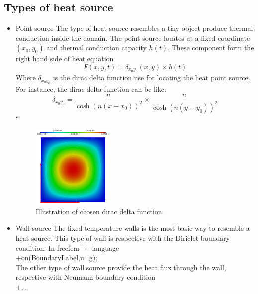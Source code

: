 \subsection{Types of heat source}
\begin{itemize}
	\item Point source
	The type of heat source resembles a tiny object produce thermal conduction inside the domain. The point source locates at a fixed coordinate $(x_0,y_0)$ and thermal conduction capacity $h(t)$. These component form the right hand side of heat equation
	$$
	F(x,y,t) = \delta_{x_0 y_0}(x,y)\times h(t)
	$$
	Where $\delta_{x_0 y_0}$ is the dirac delta function use for locating the heat point source. For instance, the dirac delta function can be like:
	$$
	\delta_{x_0 y_0} = \dfrac{n}{\cosh(n(x-x_0))^2}\times\dfrac{n}{\cosh(n(y-y_0))^2}
	$$``
	\begin{figure}[ht]
		\centering
		\includegraphics[width=4cm]{dirac}
		\caption{Illustration of chosen dirac delta function.}
	\end{figure}
	\item Wall source
	The fixed temperature walls is the most basic way to resemble a heat source. This type of wall is respective with the Diriclet boundary condition. In freefem++ language\\
	+on(BoundaryLabel,u=g);\\
	The other type of wall source provide the heat flux through the wall, respective with Neumann boundary condition\\
	+...\\
\end{itemize}